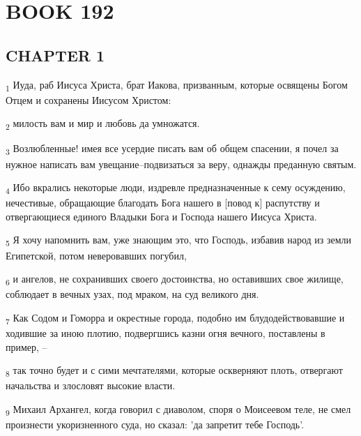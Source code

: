 \section{BOOK 192}
\subsection{CHAPTER 1}
\begin{tcolorbox}
\textsubscript{1} Иуда, раб Иисуса Христа, брат Иакова, призванным, которые освящены Богом Отцем и сохранены Иисусом Христом:
\end{tcolorbox}
\begin{tcolorbox}
\textsubscript{2} милость вам и мир и любовь да умножатся.
\end{tcolorbox}
\begin{tcolorbox}
\textsubscript{3} Возлюбленные! имея все усердие писать вам об общем спасении, я почел за нужное написать вам увещание--подвизаться за веру, однажды преданную святым.
\end{tcolorbox}
\begin{tcolorbox}
\textsubscript{4} Ибо вкрались некоторые люди, издревле предназначенные к сему осуждению, нечестивые, обращающие благодать Бога нашего в [повод к] распутству и отвергающиеся единого Владыки Бога и Господа нашего Иисуса Христа.
\end{tcolorbox}
\begin{tcolorbox}
\textsubscript{5} Я хочу напомнить вам, уже знающим это, что Господь, избавив народ из земли Египетской, потом неверовавших погубил,
\end{tcolorbox}
\begin{tcolorbox}
\textsubscript{6} и ангелов, не сохранивших своего достоинства, но оставивших свое жилище, соблюдает в вечных узах, под мраком, на суд великого дня.
\end{tcolorbox}
\begin{tcolorbox}
\textsubscript{7} Как Содом и Гоморра и окрестные города, подобно им блудодействовавшие и ходившие за иною плотию, подвергшись казни огня вечного, поставлены в пример, --
\end{tcolorbox}
\begin{tcolorbox}
\textsubscript{8} так точно будет и с сими мечтателями, которые оскверняют плоть, отвергают начальства и злословят высокие власти.
\end{tcolorbox}
\begin{tcolorbox}
\textsubscript{9} Михаил Архангел, когда говорил с диаволом, споря о Моисеевом теле, не смел произнести укоризненного суда, но сказал: 'да запретит тебе Господь'.
\end{tcolorbox}
